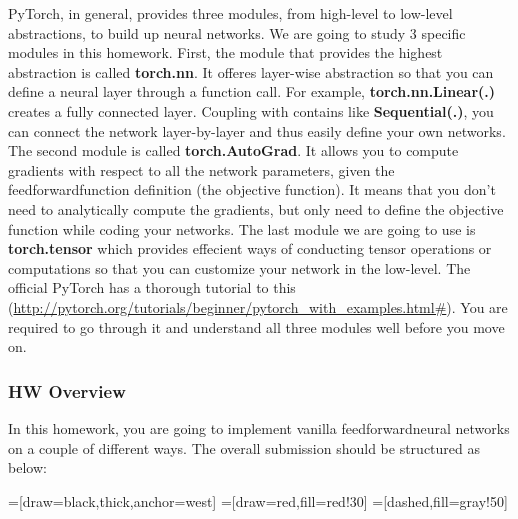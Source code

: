 \documentclass{article}
\newcommand{\homeworknumber}{1}
\begin{document}
PyTorch, in general, provides three modules, from high-level to low-level abstractions, to build up neural networks. We are going to study 3 specific modules in this homework. First, the module that provides the highest abstraction is called \textbf{torch.nn}. It offeres layer-wise abstraction so that you can define a neural layer through a function call. For example, \textbf{torch.nn.Linear(.)} creates a fully connected layer. Coupling with contains like \textbf{Sequential(.)}, you can connect the network layer-by-layer and thus easily define your own networks. The second module is called \textbf{torch.AutoGrad}. It allows you to compute gradients with respect to all the network parameters, given the feedforwardfunction definition (the objective function). It means that you don't need to analytically compute the gradients, but only need to define the objective function while coding your networks. The last module we are going to use is \textbf{torch.tensor} which provides effecient ways of conducting tensor operations or computations so that you can customize your network in the low-level. The official PyTorch has a thorough tutorial to this (\url{http://pytorch.org/tutorials/beginner/pytorch_with_examples.html#}). You are required to go through it and understand all three modules well before you move on.


\subsubsection*{HW Overview}

In this homework, you are going to implement vanilla feedforwardneural networks on a couple of different ways. The overall submission should be structured as below:

\hfill

=[draw=black,thick,anchor=west]
=[draw=red,fill=red!30]
=[dashed,fill=gray!50]
\end{document}
